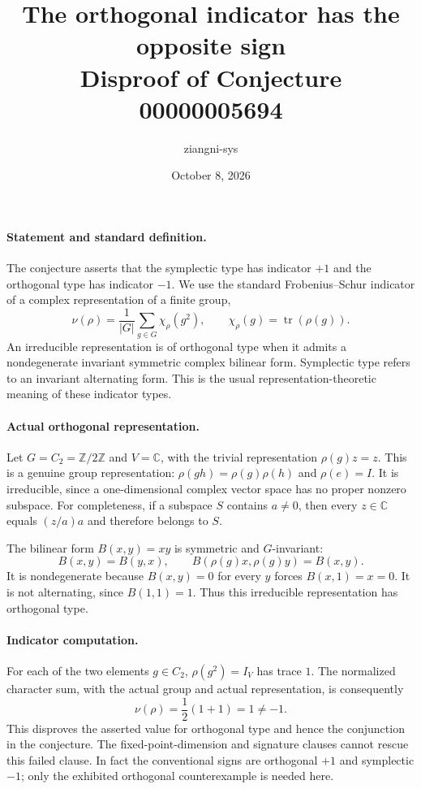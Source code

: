 \documentclass[11pt]{article}
\title{The orthogonal indicator has the opposite sign\\Disproof of Conjecture 00000005694}
\author{ziangni-sys}
\date{October 8, 2026}
\begin{document}
\maketitle
\paragraph{Statement and standard definition.}
The conjecture asserts that the symplectic type has indicator $+1$
and the orthogonal type has indicator $-1$. We use the standard
Frobenius--Schur indicator of a complex representation of a finite group,
\[
 \nu(\rho)=\frac{1}{|G|}\sum_{g\in G}\chi_\rho(g^2),
 \qquad \chi_\rho(g)=\operatorname{tr}(\rho(g)).
\]
An irreducible representation is of orthogonal type when it admits a
nondegenerate invariant symmetric complex bilinear form. Symplectic
type refers to an invariant alternating form. This is the usual
representation-theoretic meaning of these indicator types.

\paragraph{Actual orthogonal representation.}
Let $G=C_2=\mathbb Z/2\mathbb Z$ and $V=\mathbb C$, with the trivial
representation $\rho(g)z=z$. This is a genuine group representation:
$\rho(gh)=\rho(g)\rho(h)$ and $\rho(e)=I$. It is irreducible, since a
one-dimensional complex vector space has no proper nonzero subspace.
For completeness, if a subspace $S$ contains $a\ne0$, then every
$z\in\mathbb C$ equals $(z/a)a$ and therefore belongs to $S$.

The bilinear form $B(x,y)=xy$ is symmetric and $G$-invariant:
\[
 B(x,y)=B(y,x),\qquad B(\rho(g)x,\rho(g)y)=B(x,y).
\]
It is nondegenerate because $B(x,y)=0$ for every $y$ forces
$B(x,1)=x=0$. It is not alternating, since $B(1,1)=1$.
Thus this irreducible representation has orthogonal type.

\paragraph{Indicator computation.}
For each of the two elements $g\in C_2$, $\rho(g^2)=I_V$ has trace
$1$. The normalized character sum, with the actual group and actual
representation, is consequently
\[
 \nu(\rho)=\frac12(1+1)=1\ne-1.
\]
This disproves the asserted value for orthogonal type and hence the
conjunction in the conjecture. The fixed-point-dimension and signature
clauses cannot rescue this failed clause. In fact the conventional signs
are orthogonal $+1$ and symplectic $-1$; only the exhibited orthogonal
counterexample is needed here.
\end{document}
